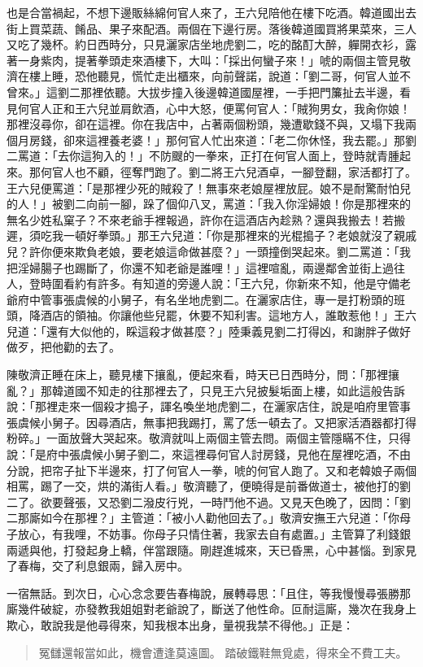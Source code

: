 也是合當禍起，不想下邊販絲綿何官人來了，王六兒陪他在樓下吃酒。韓道國出去街上買菜蔬、餚品、果子來配酒。兩個在下邊行房。落後韓道國買將果菜來，三人又吃了幾杯。約日西時分，只見灑家店坐地虎劉二，吃的酩酊大醉，軃開衣衫，露著一身紫肉，提著拳頭走來酒樓下，大叫：「採出何蠻子來！」唬的兩個主管見敬濟在樓上睡，恐他聽見，慌忙走出櫃來，向前聲諾，說道：「劉二哥，何官人並不曾來。」這劉二那裡依聽。大拔步撞入後邊韓道國屋裡，一手把門簾扯去半邊，看見何官人正和王六兒並肩飲酒，心中大怒，便罵何官人：「賊狗男女，我肏你娘！那裡沒尋你，卻在這裡。你在我店中，占著兩個粉頭，幾遭歇錢不與，又塌下我兩個月房錢，卻來這裡養老婆！」那何官人忙出來道：「老二你休怪，我去罷。」那劉二罵道：「去你這狗入的！」不防颼的一拳來，正打在何官人面上，登時就青腫起來。那何官人也不顧，徑奪門跑了。劉二將王六兒酒卓，一腳登翻，家活都打了。王六兒便罵道：「是那裡少死的賊殺了！無事來老娘屋裡放屁。娘不是耐驚耐怕兒的人！」被劉二向前一腳，跺了個仰八叉，罵道：「我入你淫婦娘！你是那裡來的無名少姓私窠子？不來老爺手裡報過，許你在這酒店內趁熟？還與我搬去！若搬遲，須吃我一頓好拳頭。」那王六兒道：「你是那裡來的光棍搗子？老娘就沒了親戚兒？許你便來欺負老娘，要老娘這命做甚麼？」一頭撞倒哭起來。劉二罵道：「我把淫婦腸子也踢斷了，你還不知老爺是誰哩！」這裡喧亂，兩邊鄰舍並街上過往人，登時圍看約有許多。有知道的旁邊人說：「王六兒，你新來不知，他是守備老爺府中管事張虞候的小舅子，有名坐地虎劉二。在灑家店住，專一是打粉頭的班頭，降酒店的領袖。你讓他些兒罷，休要不知利害。這地方人，誰敢惹他！」王六兒道：「還有大似他的，睬這殺才做甚麼？」陸秉義見劉二打得凶，和謝胖子做好做歹，把他勸的去了。

陳敬濟正睡在床上，聽見樓下攘亂，便起來看，時天已日西時分，問：「那裡攘亂？」那韓道國不知走的往那裡去了，只見王六兒披髮垢面上樓，如此這般告訴說：「那裡走來一個殺才搗子，諢名喚坐地虎劉二，在灑家店住，說是咱府里管事張虞候小舅子。因尋酒店，無事把我踢打，罵了恁一頓去了。又把家活酒器都打得粉碎。」一面放聲大哭起來。敬濟就叫上兩個主管去問。兩個主管隱瞞不住，只得說：「是府中張虞候小舅子劉二，來這裡尋何官人討房錢，見他在屋裡吃酒，不由分說，把帘子扯下半邊來，打了何官人一拳，唬的何官人跑了。又和老韓娘子兩個相罵，踢了一交，烘的滿街人看。」敬濟聽了，便曉得是前番做道士，被他打的劉二了。欲要聲張，又恐劉二潑皮行兇，一時鬥他不過。又見天色晚了，因問：「劉二那廝如今在那裡？」主管道：「被小人勸他回去了。」敬濟安撫王六兒道：「你母子放心，有我哩，不妨事。你母子只情住著，我家去自有處置。」主管算了利錢銀兩遞與他，打發起身上轎，伴當跟隨。剛趕進城來，天已昏黑，心中甚惱。到家見了春梅，交了利息銀兩，歸入房中。

一宿無話。到次日，心心念念要告春梅說，展轉尋思：「且住，等我慢慢尋張勝那廝幾件破綻，亦發教我姐姐對老爺說了，斷送了他性命。叵耐這廝，幾次在我身上欺心，敢說我是他尋得來，知我根本出身，量視我禁不得他。」正是：
\begin{quote}
冤讎還報當如此，機會遭逢莫遠圖。
踏破鐵鞋無覓處，得來全不費工夫。
\end{quote}

